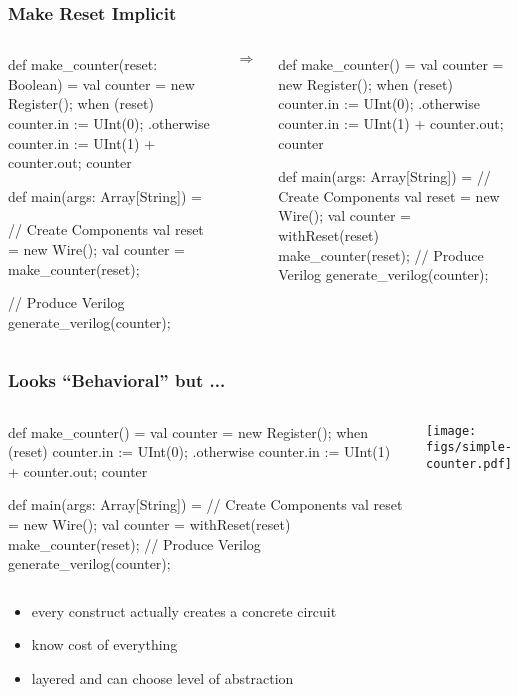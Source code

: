 \begin{frame}[fragile]
\frametitle{Make Reset Implicit}
\begin{columns}
{
\begin{scala}
def make_counter(reset: Boolean) = {
  val counter = new Register();
  when (reset) {
    counter.in := UInt(0);
  } .otherwise {
    counter.in := UInt(1) + counter.out;
  }
  counter
}

def main(args: Array[String]) = {
  // Create Components
  val reset   = new Wire();
  val counter = make_counter(reset);

  // Produce Verilog
  generate_verilog(counter);
}
\end{scala}
}
\begin{center}
$\Rightarrow$
\end{center}
{
\begin{scala}
def make_counter() = {
  val counter = new Register();
  when (reset) {
    counter.in := UInt(0);
  } .otherwise {
    counter.in := UInt(1) + counter.out;
  }
  counter
}

def main(args: Array[String]) = {
  // Create Components
  val reset   = new Wire();
  val counter = 
    withReset(reset) {
      make_counter(reset);
    }
  // Produce Verilog
  generate_verilog(counter);
}
\end{scala}
}
\end{columns}
\end{frame}

\begin{frame}[fragile]
\frametitle{Looks ``Behavioral'' but ...}
\begin{columns}
{
\begin{scala}
def make_counter() = {
  val counter = new Register();
  when (reset) {
    counter.in := UInt(0);
  } .otherwise {
    counter.in := UInt(1) + counter.out;
  }
  counter
}

def main(args: Array[String]) = {
  // Create Components
  val reset   = new Wire();
  val counter = 
    withReset(reset) {
      make_counter(reset);
    }
  // Produce Verilog
  generate_verilog(counter);
}
\end{scala}
}
\begin{center}
\texttt{[image: figs/simple-counter.pdf]}
\end{center}
\end{columns}
\begin{itemize}
\item every construct actually creates a concrete circuit
\item know cost of everything
\item layered and can choose level of abstraction
\end{itemize}
\end{frame}

